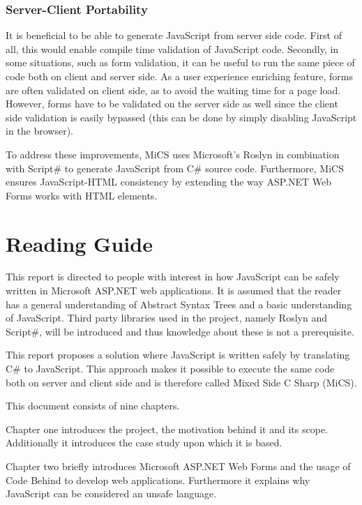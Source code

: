 \subsubsection{Server-Client Portability} %
	It is beneficial to be able to generate JavaScript from server side code. First of all, this would enable compile time validation of JavaScript code. Secondly, in some situations, such as form validation, it can be useful to run the same piece of code both on client and server side. As a user experience enriching feature, forms are often validated on client side, as to avoid the waiting time for a page load. However, forms have to be validated on the server side as well since the client side validation is easily bypassed (this can be done by simply disabling JavaScript in the browser). \newline


To address these improvements, MiCS uses Microsoft's Roslyn in combination with Script\# to generate JavaScript from C\# source code. Furthermore, MiCS ensures JavaScript-HTML consistency by extending the way ASP.NET Web Forms works with HTML elements.

\section{Reading Guide}

	This report is directed to people with interest in how JavaScript can be safely written in Microsoft ASP.NET web applications. It is assumed that the reader has a general understanding of Abstract Syntax Trees and a basic understanding of JavaScript. Third party libraries used in the project, namely Roslyn and Script\#, will be introduced and thus knowledge about these is not a prerequisite.

	This report proposes a solution where JavaScript is written safely by translating C\# to JavaScript. This approach makes it possible to execute the same code both on server and client side and is therefore called Mixed Side C Sharp (MiCS).

	This document consists of nine chapters.

	Chapter one introduces the project, the motivation behind it and its scope. Additionally it introduces the case study upon which it is based.

	Chapter two briefly introduces Microsoft ASP.NET Web Forms and the usage of Code Behind to develop web applications. Furthermore it explains why JavaScript can be considered an unsafe language.

